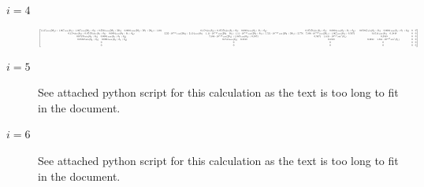 \documentclass[journal]{new-aiaa}
\begin{document}
\begin{description}
    \item[$i=4$] \hfill
    \[
        \resizebox{\textwidth}{!}{$
        \left[\begin{matrix}1.135 \cos{\left(2 \theta_{2} \right)} + 1.067 \cos{\left(\theta_{3} \right)} + 1.067 \cos{\left(2 \theta_{2} + \theta_{3} \right)} + 0.2508 \cos{\left(2 \theta_{2} + 2 \theta_{3} \right)} - 0.0008 \cos{\left(2 \theta_{2} + 2 \theta_{3} + 2 \theta_{4} \right)} + 1.401 & 0.159 \sin{\left(\theta_{2} \right)} + 0.07476 \sin{\left(\theta_{2} + \theta_{3} \right)} - 0.0004 \cos{\left(\theta_{2} + \theta_{3} + \theta_{4} \right)} & 0.07476 \sin{\left(\theta_{2} + \theta_{3} \right)} - 0.0004 \cos{\left(\theta_{2} + \theta_{3} + \theta_{4} \right)} & - 0.05965 \sin{\left(\theta_{2} + \theta_{3} \right)} - 0.0004 \cos{\left(\theta_{2} + \theta_{3} + \theta_{4} \right)} & 0 & 0\\0.159 \sin{\left(\theta_{2} \right)} + 0.07476 \sin{\left(\theta_{2} + \theta_{3} \right)} - 0.0004 \cos{\left(\theta_{2} + \theta_{3} + \theta_{4} \right)} & 2.22 \cdot 10^{-16} \cos{\left(2 \theta_{2} \right)} + 2.134 \cos{\left(\theta_{3} \right)} - 1.11 \cdot 10^{-16} \cos{\left(2 \theta_{2} - \theta_{3} \right)} + 1.11 \cdot 10^{-16} \cos{\left(2 \theta_{2} + \theta_{3} \right)} + 5.551 \cdot 10^{-17} \cos{\left(2 \theta_{2} + 2 \theta_{3} \right)} + 2.776 & 7.806 \cdot 10^{-18} \cos{\left(2 \theta_{1} \right)} + 1.067 \cos{\left(\theta_{3} \right)} + 0.5071 & - 0.8514 \cos{\left(\theta_{3} \right)} - 0.3949 & 0 & 0\\0.07476 \sin{\left(\theta_{2} + \theta_{3} \right)} - 0.0004 \cos{\left(\theta_{2} + \theta_{3} + \theta_{4} \right)} & 7.806 \cdot 10^{-18} \cos{\left(2 \theta_{1} \right)} + 1.067 \cos{\left(\theta_{3} \right)} + 0.5071 & 0.5071 - 1.648 \cdot 10^{-17} \sin^{2}{\left(\theta_{1} \right)} & -0.3949 & 0 & 0\\- 0.05965 \sin{\left(\theta_{2} + \theta_{3} \right)} - 0.0004 \cos{\left(\theta_{2} + \theta_{3} + \theta_{4} \right)} & - 0.8514 \cos{\left(\theta_{3} \right)} - 0.3949 & -0.3949 & 0.3248 - 1.561 \cdot 10^{-17} \sin^{2}{\left(\theta_{1} \right)} & 0 & 0\\0 & 0 & 0 & 0 & 0 & 0\\0 & 0 & 0 & 0 & 0 & 0\end{matrix}\right]
        $}
    \]

    \item[$i=5$] \hfill
    See attached python script for this calculation as the text is too long to fit in the document.

    \item[$i=6$] \hfill
    See attached python script for this calculation as the text is too long to fit in the document.

\end{description}
\end{document}
